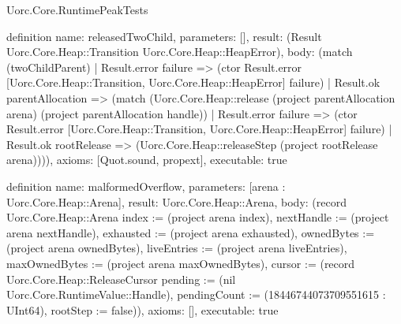 \begin{lexlean}{Uorc.Core.RuntimePeakTests}
\begin{semanticmodule}
definition{
  name: releasedTwoChild,
  parameters: [],
  result: (Result Uorc.Core.Heap::Transition Uorc.Core.Heap::HeapError),
  body: (match (twoChildParent)
    | Result.error failure => (ctor Result.error [Uorc.Core.Heap::Transition, Uorc.Core.Heap::HeapError] failure)
    | Result.ok parentAllocation => (match (Uorc.Core.Heap::release (project parentAllocation arena) (project parentAllocation handle))
      | Result.error failure => (ctor Result.error [Uorc.Core.Heap::Transition, Uorc.Core.Heap::HeapError] failure)
      | Result.ok rootRelease => (Uorc.Core.Heap::releaseStep (project rootRelease arena)))),
  axioms: [Quot.sound, propext],
  executable: true
}

definition{
  name: malformedOverflow,
  parameters: [arena : Uorc.Core.Heap::Arena],
  result: Uorc.Core.Heap::Arena,
  body: (record Uorc.Core.Heap::Arena {index := (project arena index), nextHandle := (project arena nextHandle), exhausted := (project arena exhausted), ownedBytes := (project arena ownedBytes), liveEntries := (project arena liveEntries), maxOwnedBytes := (project arena maxOwnedBytes), cursor := (record Uorc.Core.Heap::ReleaseCursor {pending := (nil Uorc.Core.RuntimeValue::Handle), pendingCount := (18446744073709551615 : UInt64), rootStep := false})}),
  axioms: [],
  executable: true
}


\end{semanticmodule}
\end{lexlean}

